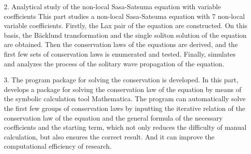 \begin{eabstract}
2. Analytical study of the non-local Sasa-Satsuma equation with variable coefficients
This part studies a non-local Sasa-Satsuma equation with 7 non-local variable coefficients. Firstly, the Lax pair of the equation are constructed. On this basis, the B\"{a}cklund transformation and the single soliton solution of the equation are obtained. Then the conservation laws of the equations are derived, and the first few sets of conservation laws is enumerated and tested. Finally, simulates and analyzes the process of the solitary wave propagation of the equation.

3. The program package for solving the conservation is developed.
In this part, develops a package for solving the conservation law of the equation by means of the symbolic calculation tool Mathematica. The program can automatically solve the first few groups of conservation laws by inputting the iterative relation of the conservation law of the equation and the general formula of the necessary coefficients and the starting term, which not only reduces the difficulty of manual calculation, but also ensures the correct result. And it can improve the computational efficiency of research.

\end{eabstract}

